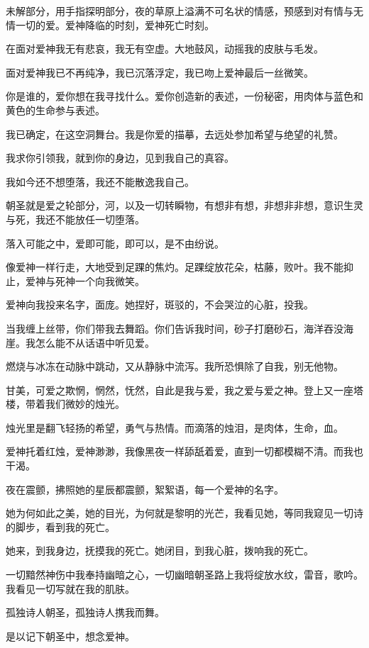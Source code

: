 \documentclass[UTF8]{article}
\begin{document}
\par 未解部分，用手指探明部分，夜的草原上溢满不可名状的情感，预感到对有情与无情一切的爱。爱神降临的时刻，爱神死亡时刻。
\par 在面对爱神我无有悲哀，我无有空虚。大地鼓风，动摇我的皮肤与毛发。
\par 面对爱神我已不再纯净，我已沉落浮定，我已吻上爱神最后一丝微笑。
\par 你是谁的，爱你想在我寻找什么。爱你创造新的表述，一份秘密，用肉体与蓝色和黄色的生命参与表述。
\par 我已确定，在这空洞舞台。我是你爱的描摹，去远处参加希望与绝望的礼赞。
\par 我求你引领我，就到你的身边，见到我自己的真容。
\\[0.6cm]
\par 我如今还不想堕落，我还不能散逸我自己。
\par 朝圣就是爱之轮部分，河，以及一切转瞬物，有想非有想，非想非非想，意识生灵与死，我还不能放任一切堕落。
\par 落入可能之中，爱即可能，即可以，是不由纷说。
\par 像爱神一样行走，大地受到足踝的焦灼。足踝绽放花朵，枯藤，败叶。我不能抑止，爱神与死神一个向我微笑。
\par 爱神向我投来名字，面庞。她捏好，斑驳的，不会哭泣的心脏，投我。
\par 当我缠上丝带，你们带我去舞蹈。你们告诉我时间，砂子打磨砂石，海洋吞没海崖。我怎么能不从话语中听见爱。
\par 燃烧与冰冻在动脉中跳动，又从静脉中流泻。我所恐惧除了自我，别无他物。
\par 甘美，可爱之欺惘，惘然，怃然，自此是我与爱，我之爱与爱之神。登上又一座塔楼，带着我们微妙的烛光。
\par 烛光里是翻飞轻扬的希望，勇气与热情。而滴落的烛泪，是肉体，生命，血。
\par 爱神托着红烛，爱神渺渺，我像黑夜一样舔舐着爱，直到一切都模糊不清。而我也干渴。
\par 夜在震颤，拂照她的星辰都震颤，絮絮语，每一个爱神的名字。
\par 她为何如此之美，她的目光，为何就是黎明的光芒，我看见她，等同我窥见一切诗的脚步，看到我的死亡。
\par 她来，到我身边，抚摸我的死亡。她闭目，到我心脏，拨响我的死亡。
\par 一切黯然神伤中我奉持幽暗之心，一切幽暗朝圣路上我将绽放水纹，雷音，歌吟。我看见一切写就在我的肌肤。
\par 孤独诗人朝圣，孤独诗人携我而舞。
\par 是以记下朝圣中，想念爱神。
\end{document}
